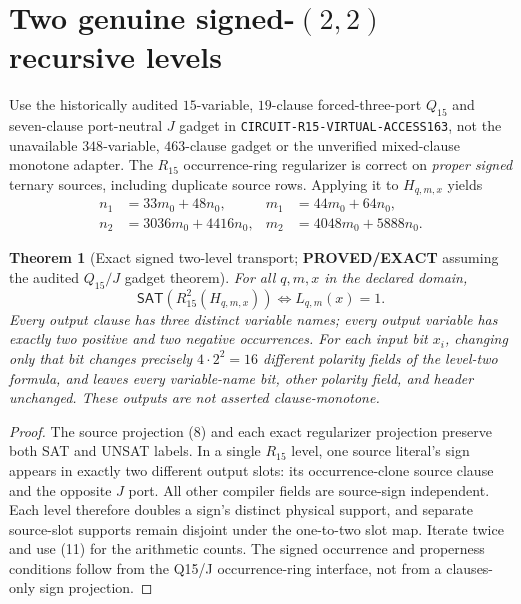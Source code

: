 \documentclass[11pt]{article}
\newtheorem{theorem}{Theorem}
\newcommand{\SAT}{\mathsf{SAT}}
\begin{document}
\section{Two genuine signed-$(2,2)$ recursive levels}
Use the historically audited $15$-variable, $19$-clause forced-three-port
$Q_{15}$ and seven-clause port-neutral $J$ gadget in
\texttt{CIRCUIT-R15-VIRTUAL-ACCESS163}, not the unavailable
$348$-variable, $463$-clause gadget or the unverified mixed-clause
monotone adapter. The $R_{15}$ occurrence-ring regularizer is correct on
\emph{proper signed} ternary sources, including duplicate source rows.
Applying it to $H_{q,m,x}$ yields
\[
 \begin{array}{rlrl}
 n_1&=33m_0+48n_0,&m_1&=44m_0+64n_0,\\
 n_2&=3036m_0+4416n_0,&m_2&=4048m_0+5888n_0.
 \end{array}\tag{11}
\]
\begin{theorem}[Exact signed two-level transport; \textbf{PROVED/EXACT}
assuming the audited $Q_{15}/J$ gadget theorem]
For all $q,m,x$ in the declared domain,
\[
 \SAT(R_{15}^{2}(H_{q,m,x}))\iff L_{q,m}(x)=1.
 \tag{12}
\]
Every output clause has three distinct variable names; every output
variable has exactly two positive and two negative occurrences.
For each input bit $x_i$, changing only that bit changes precisely
$4\cdot2^2=16$ different polarity fields of the level-two formula,
and leaves every variable-name bit, other polarity field, and header
unchanged. These outputs are \emph{not} asserted clause-monotone.
\end{theorem}
\begin{proof}
The source projection (8) and each exact regularizer projection preserve
both SAT and UNSAT labels. In a single $R_{15}$ level, one source
literal's sign appears in exactly two different output slots: its
occurrence-clone source clause and the opposite $J$ port. All other
compiler fields are source-sign independent. Each level therefore doubles
a sign's distinct physical support, and separate source-slot supports
remain disjoint under the one-to-two slot map. Iterate twice and use
(11) for the arithmetic counts. The signed occurrence and properness
conditions follow from the Q15/J occurrence-ring interface, not from a
clauses-only sign projection.
\end{proof}
\end{document}
